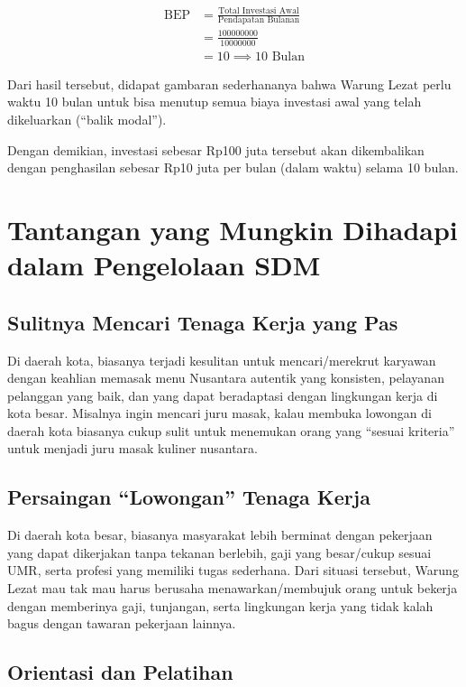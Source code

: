 \begin{align*}
    \text{BEP} &= \frac{\text{Total Investasi Awal}}{\text{Pendapatan Bulanan}} \\
    &= \frac{100 000 000}{10 000 000} \\
    &= \boxed{10} \implies \boxed{10 \text{ Bulan}}
\end{align*}

Dari hasil tersebut, didapat gambaran sederhananya bahwa Warung Lezat perlu waktu 10 bulan untuk bisa menutup semua biaya investasi awal yang telah dikeluarkan (“balik modal”).

Dengan demikian, investasi sebesar Rp100 juta tersebut akan dikembalikan dengan penghasilan sebesar Rp10 juta per bulan (dalam waktu) selama 10 bulan. 



\section{Tantangan yang Mungkin Dihadapi dalam Pengelolaan SDM}

\subsection{Sulitnya Mencari Tenaga Kerja yang Pas}

Di daerah kota, biasanya terjadi kesulitan untuk mencari/merekrut karyawan dengan keahlian memasak menu Nusantara autentik yang konsisten, pelayanan pelanggan yang baik, dan yang dapat beradaptasi dengan lingkungan kerja di kota besar. Misalnya ingin mencari juru masak, kalau membuka lowongan di daerah kota biasanya cukup sulit untuk menemukan orang yang “sesuai kriteria” untuk menjadi juru masak kuliner nusantara.

\subsection{Persaingan “Lowongan” Tenaga Kerja}

Di daerah kota besar, biasanya masyarakat lebih berminat dengan pekerjaan yang dapat dikerjakan tanpa tekanan berlebih, gaji yang besar/cukup sesuai UMR, serta profesi yang memiliki tugas sederhana. Dari situasi tersebut, Warung Lezat mau tak mau harus berusaha menawarkan/membujuk orang untuk bekerja dengan memberinya gaji, tunjangan, serta lingkungan kerja yang tidak kalah bagus dengan tawaran pekerjaan lainnya.

\subsection{Orientasi dan Pelatihan}

